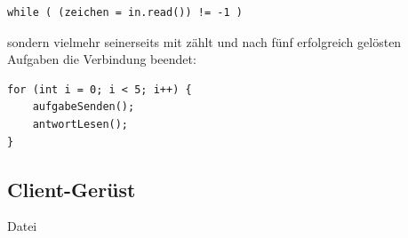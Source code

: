 \begin{lstlisting}
while ( (zeichen = in.read()) != -1 )
\end{lstlisting}
   
sondern vielmehr seinerseits mit zählt und nach fünf erfolgreich gelösten
Aufgaben die Verbindung beendet:

\begin{lstlisting}
for (int i = 0; i < 5; i++) {
    aufgabeSenden();
    antwortLesen();
}
\end{lstlisting}

\subsection{Client-Gerüst}

Datei 

